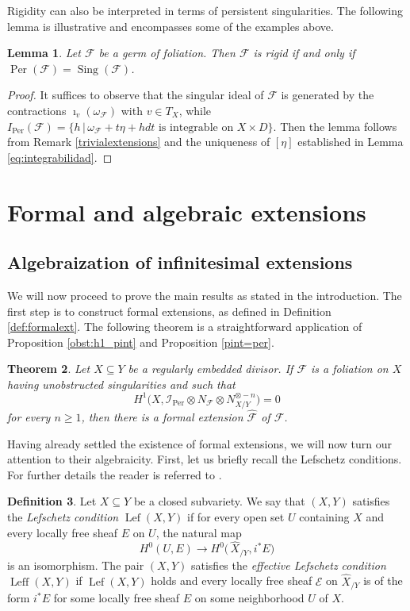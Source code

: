 \documentclass[reqno]{amsart}
\theoremstyle{plain}
\newcommand{\I}{\mathcal{I}}
\renewcommand{\I}{\mathcal{I}}
\newcommand{\F}{\mathscr{F}}
\newcommand{\E}{\mathcal{E}}
\DeclareMathOperator{\Sing}{Sing}
\DeclareMathOperator{\Per}{Per}
\DeclareMathOperator{\Lef}{Lef}
\DeclareMathOperator{\Leff}{Leff}
\newcounter{Theorem}
\newtheorem{theorem}{Theorem}[section]
\newtheorem{lemma}[theorem]{Lemma}
\theoremstyle{definition}
\newtheorem{definition}[theorem]{Definition}
\theoremstyle{named}
\begin{document}
Rigidity can also be interpreted in terms of persistent singularities. The following lemma is illustrative and encompasses some of the examples above.

\begin{lemma} \label{lemma:per=rigid}
Let $\F$ be a germ of foliation. Then $\F$ is rigid if and only if $\Per(\F)=\Sing(\F)$.
\end{lemma}
\begin{proof}
It suffices to observe that the singular ideal of $\F$ is generated by the contractions $\imath_v(\omega_\F)$ with $v\in T_X$, while
$ I_{\Per}(\F)=\{ h \, \vert \, \omega_\F+ t\eta +hdt \mbox{ is integrable on } X\times D \}$.
Then the lemma follows from Remark \ref{trivialextensions} and the uniqueness of $[\eta]$ established in Lemma \ref{eq:integrabilidad}.
\end{proof}




\section{Formal and algebraic extensions}
\subsection{Algebraization of infinitesimal extensions}\label{section4.1}

We will now proceed to prove the main results as stated in the introduction. The first step is to construct formal extensions, as defined in Definition \ref{def:formalext}. The following theorem is a straightforward application of Proposition \ref{obst:h1_pint} and Proposition \ref{pint=per}.


\begin{theorem} \label{ext:formal}
Let $X\subseteq Y$ be a regularly embedded divisor. If $\F$ is a foliation on $X$ having unobstructed singularities and such that 
$$H^1\big(X,\I_{\Per}\otimes N_\F\otimes N_{X/Y}^{\otimes -n}\big)=0$$ 
for every $n \geqslant 1$, then there is a formal extension $\widehat{\F}$ of $\F$.
\end{theorem}

Having already settled the existence of formal extensions, we will now turn our attention to their algebraicity. First, let us briefly recall the Lefschetz conditions. For further details the reader is referred to \cite[Chapter 10]{badescu2012projective}.

\begin{definition} \label{lefschetz}
   Let $X\subseteq Y$ be a closed subvariety. We say that $(X,Y)$ satisfies the \textit{Lefschetz condition} $\Lef(X,Y)$ if for every open set $U$ containing $X$ and every locally free sheaf $E$ on $U$, the natural map 
   $$H^0(U,E)\to H^0\big(\,\widehat{X}_{/Y},i^*E\big)$$
   is an isomorphism. The pair $(X,Y)$ satisfies the \textit{effective Lefschetz condition} $\Leff(X,Y)$ if $\Lef(X,Y)$ holds and every locally free sheaf $\E$ on $\widehat{X}_{/Y}$ is of the form $i^*E$ for some locally free sheaf $E$ on some neighborhood $U$ of $X$.
\end{definition}
\end{document}

